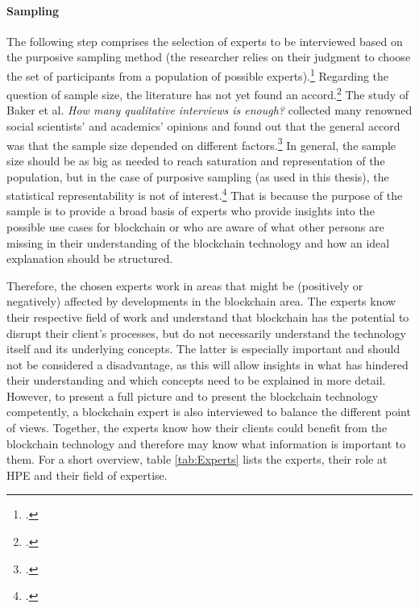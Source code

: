 \paragraph{Sampling} The following step comprises the selection of experts to be interviewed based on the purposive sampling method (the researcher relies on their judgment to choose the set of participants from a population of possible experts).\footcites[Cf.][p.137 et seqq]{Flickintroductionqualitativeresearch2009}[cf.][p.16]{EdwardsWhatqualitativeinterviewing2013}
Regarding the question of sample size, the literature has not yet found an accord.\footcites[Cf. in addition][p.1]{MorseDeterminingsamplesize2000}[cf.][p.134]{KrugerqualitativeInhaltsanalyseMethode2004} The study of Baker et al. \textit{How many qualitative interviews is enough?} collected many renowned social scientists' and academics' opinions and found out that the general accord was that the sample size depended on different factors.\footcites[Cf.][p.4 et seqq]{BakerHowmanyqualitative2012} In general, the sample size should be as big as needed to reach saturation and representation of the population, but in the case of purposive sampling (as used in this thesis), the statistical representability is not of interest.\footcite[Cf.][p.144]{MasonQualitativeresearching2002} That is because the purpose of the sample is to provide a broad basis of experts who provide insights into the possible use cases for blockchain or who are aware of what other persons are missing in their understanding of the blockchain technology and how an ideal explanation should be structured.

Therefore, the chosen experts work in areas that might be (positively or negatively) affected by developments in the blockchain area. The experts know their respective field of work and understand that blockchain has the potential to disrupt their client's processes, but do not necessarily understand the technology itself and its underlying concepts. The latter is especially important and should not be considered a disadvantage, as this will allow insights in what has hindered their understanding and which concepts need to be explained in more detail. However, to present a full picture and to present the blockchain technology competently, a blockchain expert is also interviewed to balance the different point of views. Together, the experts know how their clients could benefit from the blockchain technology and therefore may know what information is important to them. For a short overview, table \ref{tab:Experts} lists the experts, their role at HPE and their field of expertise.

